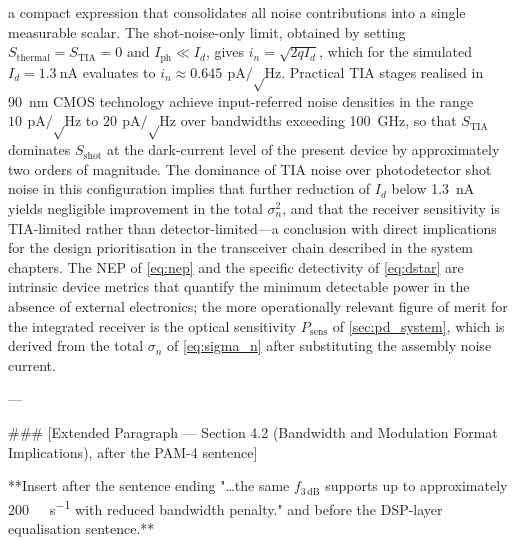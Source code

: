 a compact expression that consolidates all noise contributions into a single measurable scalar. The shot-noise-only limit, obtained by setting $S_\mathrm{thermal} = S_\mathrm{TIA} = 0$ and $I_\mathrm{ph} \ll I_d$, gives $i_n = \sqrt{2qI_d}$, which for the simulated $I_d = \SI{1.3}{\nano\ampere}$ evaluates to $i_n \approx \SI{0.645}{\pico\ampere\per\sqrt\hertz}$. Practical TIA stages realised in \SI{90}{\nano\metre} CMOS technology achieve input-referred noise densities in the range $\SI{10}{\pico\ampere\per\sqrt\hertz}$ to $\SI{20}{\pico\ampere\per\sqrt\hertz}$ over bandwidths exceeding \SI{100}{\giga\hertz}, so that $S_\mathrm{TIA}$ dominates $S_\mathrm{shot}$ at the dark-current level of the present device by approximately two orders of magnitude. The dominance of TIA noise over photodetector shot noise in this configuration implies that further reduction of $I_d$ below \SI{1.3}{\nano\ampere} yields negligible improvement in the total $\sigma_n^2$, and that the receiver sensitivity is TIA-limited rather than detector-limited—a conclusion with direct implications for the design prioritisation in the transceiver chain described in the system chapters. The NEP of \cref{eq:nep} and the specific detectivity of \cref{eq:dstar} are intrinsic device metrics that quantify the minimum detectable power in the absence of external electronics; the more operationally relevant figure of merit for the integrated receiver is the optical sensitivity $P_\mathrm{sens}$ of \cref{sec:pd_system}, which is derived from the total $\sigma_n$ of \cref{eq:sigma_n} after substituting the assembly noise current.

---

### [Extended Paragraph — Section 4.2 (Bandwidth and Modulation Format Implications), after the PAM-4 sentence]

**Insert after the sentence ending "…the same $f_{3\,\mathrm{dB}}$ supports up to approximately \SI{200}{\giga\bit\per\second} with reduced bandwidth penalty." and before the DSP-layer equalisation sentence.**

